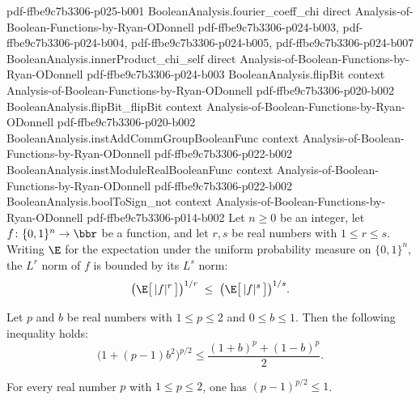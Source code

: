 \begin{lemma}
{    pdf-ffbe9c7b3306-p025-b001}
\proofstep
  {BooleanAnalysis.fourier_coeff_chi}
  {direct}
  {Analysis-of-Boolean-Functions-by-Ryan-ODonnell}
  {pdf-ffbe9c7b3306-p024-b003,
    pdf-ffbe9c7b3306-p024-b004,
    pdf-ffbe9c7b3306-p024-b005,
    pdf-ffbe9c7b3306-p024-b007}
\proofstep
  {BooleanAnalysis.innerProduct_chi_self}
  {direct}
  {Analysis-of-Boolean-Functions-by-Ryan-ODonnell}
  {pdf-ffbe9c7b3306-p024-b003}
\proofstep
  {BooleanAnalysis.flipBit}
  {context}
  {Analysis-of-Boolean-Functions-by-Ryan-ODonnell}
  {pdf-ffbe9c7b3306-p020-b002}
\proofstep
  {BooleanAnalysis.flipBit_flipBit}
  {context}
  {Analysis-of-Boolean-Functions-by-Ryan-ODonnell}
  {pdf-ffbe9c7b3306-p020-b002}
\proofstep
  {BooleanAnalysis.instAddCommGroupBooleanFunc}
  {context}
  {Analysis-of-Boolean-Functions-by-Ryan-ODonnell}
  {pdf-ffbe9c7b3306-p022-b002}
\proofstep
  {BooleanAnalysis.instModuleRealBooleanFunc}
  {context}
  {Analysis-of-Boolean-Functions-by-Ryan-ODonnell}
  {pdf-ffbe9c7b3306-p022-b002}
\proofstep
  {BooleanAnalysis.boolToSign_not}
  {context}
  {Analysis-of-Boolean-Functions-by-Ryan-ODonnell}
  {pdf-ffbe9c7b3306-p014-b002}
\label{BooleanAnalysis.Hypercontractivity.lp_norm_mono}
Let $n\ge0$ be an integer, let $f\colon\{0,1\}^n\to\bbr$ be a function, and let $r,s$ be
real numbers with
$1\le r\le s$. Writing $\E$ for the expectation under the uniform probability measure on
$\{0,1\}^n$, the $L^r$ norm of $f$ is bounded by its $L^s$ norm:
\[
  \big(\E\big[\,|f|^{r}\,\big]\big)^{1/r}\;\le\;\big(\E\big[\,|f|^{s}\,\big]\big)^{1/s}.
\]
\end{lemma}

\begin{theorem}
\leanok
{}
\label{BooleanAnalysis.Hypercontractivity.two_point_ineq_unit}
Let $p$ and $b$ be real numbers with $1 \le p \le 2$ and $0 \le b \le 1$. Then the
following inequality holds:
\[
  \big(1 + (p-1)b^2\big)^{p/2} \le \frac{(1+b)^p + (1-b)^p}{2}.
\]
\end{theorem}

\begin{lemma}[Two-point inequality in the case $a=0$]
\leanok
{}
\label{BooleanAnalysis.Hypercontractivity.two_point_ineq_a_zero}
For every real number $p$ with $1 \le p \le 2$, one has $(p-1)^{p/2} \le 1$.
\end{lemma}

